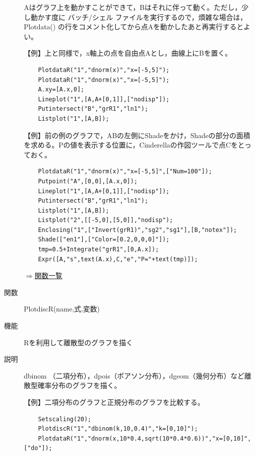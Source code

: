 \documentclass[papersize,a4paper,12pt,uplatex]{jsarticle}
\begin{document}
\begin{description}
Aはグラフ上を動かすことができて，Bはそれに伴って動く。ただし，少し動かす度に バッチ/シェル ファイルを実行するので，煩雑な場合は，Plotdata() の行をコメント化してから点Aを動かしたあと再実行するとよい。

\vspace{\baselineskip}
【例】上と同様で，x軸上の点を自由点Aとし，曲線上にBを置く。
\begin{verbatim}
    PlotdataR("1","dnorm(x)","x=[-5,5]");
    PlotdataR("1","dnorm(x)","x=[-5,5]");
    A.xy=[A.x,0];
    Lineplot("1",[A,A+[0,1]],["nodisp"]);
    Putintersect("B","grR1","ln1");
    Listplot("1",[A,B]);
\end{verbatim}
\vspace{\baselineskip}
【例】前の例のグラフで，ABの左側にShadeをかけ，Shadeの部分の面積を求める。Pの値を表示する位置に，Cinderellaの作図ツールで点Cをとっておく。
\begin{verbatim}
    PlotdataR("1","dnorm(x)","x=[-5,5]",["Num=100"]);
    Putpoint("A",[0,0],[A.x,0]);
    Lineplot("1",[A,A+[0,1]],["nodisp"]);
    Putintersect("B","grR1","ln1");
    Listplot("1",[A,B]);
    Listplot("2",[[-5,0],[5,0]],"nodisp");
    Enclosing("1",["Invert(grR1)","sg2","sg1"],[B,"notex"]);
    Shade(["en1"],["Color=[0.2,0,0,0]"]);
    tmp=0.5+Integrate("grR1",[0,A.x]);
    Expr([A,"s",text(A.x),C,"e","P="+text(tmp)]);
\end{verbatim}

    \begin{center}  \end{center}

\vspace{\baselineskip}
\begin{flushright}  \hyperlink{functionlist}{$\Rightarrow$関数一覧}\end{flushright}

\vspace{\baselineskip}
\hypertarget{plotdiscr}{}
\item[関数]  PlotdiscR(name,式,変数)
\item[機能]  Rを利用して離散型のグラフを描く
\item[説明]  dbinom （二項分布），dpois（ポアソン分布），dgeom（幾何分布）など離散型確率分布のグラフを描く。

\vspace{\baselineskip}
【例】二項分布のグラフと正規分布のグラフを比較する。
\begin{verbatim}
    Setscaling(20);
    PlotdiscR("1","dbinom(k,10,0.4)","k=[0,10]");
    PlotdataR("1","dnorm(x,10*0.4,sqrt(10*0.4*0.6))","x=[0,10]",["do"]);
\end{verbatim}
\vspace{\baselineskip}
\begin{center} \scalebox{0.9}{} \end{center}


\end{description}
\end{document}
